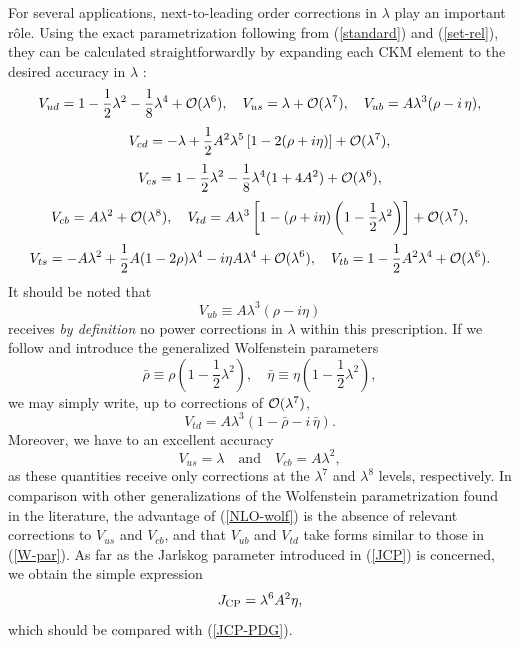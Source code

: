 \documentclass[12pt]{article}
\begin{document}
For several applications, next-to-leading order corrections in $\lambda$ 
play an important r\^ole. Using the exact parametrization following from 
(\ref{standard}) and (\ref{set-rel}), they can be calculated straightforwardly 
by expanding each CKM element to the desired accuracy in 
$\lambda$ \cite{blo,Brev01}:
\begin{displaymath}
V_{ud}=1-\frac{1}{2}\lambda^2-\frac{1}{8}\lambda^4+{\cal O}(\lambda^6),\quad
V_{us}=\lambda+{\cal O}(\lambda^7),\quad
V_{ub}=A\lambda^3(\rho-i\,\eta),
\end{displaymath}
\begin{displaymath}
V_{cd}=-\lambda+\frac{1}{2}A^2\lambda^5\left[1-2(\rho+i\eta)\right]+
{\cal O}(\lambda^7),
\end{displaymath}
\begin{equation}\label{NLO-wolf}
V_{cs}=1-\frac{1}{2}\lambda^2-\frac{1}{8}\lambda^4(1+4A^2)+
{\cal O}(\lambda^6),
\end{equation}
\begin{displaymath}
V_{cb}=A\lambda^2+{\cal O}(\lambda^8),\quad
V_{td}=A\lambda^3\left[1-(\rho+i\eta)\left(1-\frac{1}{2}\lambda^2\right)
\right]+{\cal O}(\lambda^7),
\end{displaymath}
\begin{displaymath}
V_{ts}=-A\lambda^2+\frac{1}{2}A(1-2\rho)\lambda^4-i\eta A\lambda^4
+{\cal O}(\lambda^6),\quad
V_{tb}=1-\frac{1}{2}A^2\lambda^4+{\cal O}(\lambda^6).
\end{displaymath}
It should be noted that 
\begin{equation}
V_{ub}\equiv A\lambda^3(\rho-i\eta)
\end{equation}
receives {\it by definition} no power corrections in $\lambda$ within
this prescription. If we follow \cite{blo} and introduce the generalized
Wolfenstein parameters
\begin{equation}\label{rho-eta-bar}
\bar\rho\equiv\rho\left(1-\frac{1}{2}\lambda^2\right),\quad
\bar\eta\equiv\eta\left(1-\frac{1}{2}\lambda^2\right),
\end{equation}
we may simply write, up to corrections of ${\cal O}(\lambda^7)$,
\begin{equation}\label{Vtd-expr}
V_{td}=A\lambda^3(1-\bar\rho-i\,\bar\eta).
\end{equation}
Moreover, we have to an excellent accuracy
\begin{equation}\label{Def-A}
V_{us}=\lambda\quad \mbox{and}\quad 
V_{cb}=A\lambda^2,
\end{equation}
as these quantities receive only corrections at the $\lambda^7$ and
$\lambda^8$ levels, respectively. In comparison with other generalizations
of the Wolfenstein parametrization found in the literature, the advantage
of (\ref{NLO-wolf}) is the absence of relevant corrections to $V_{us}$
and $V_{cb}$, and that $V_{ub}$ and $V_{td}$ take forms similar to those 
in (\ref{W-par}). As far as the Jarlskog parameter introduced in
(\ref{JCP}) is concerned, we obtain the simple expression
\begin{equation}
J_{\rm CP}=\lambda^6A^2\eta,
\end{equation}
which should be compared with (\ref{JCP-PDG}).
\end{document}
